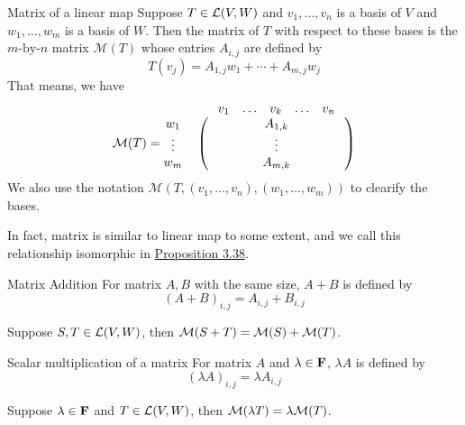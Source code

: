 \documentclass[12pt,a4paper]{article}
\begin{document}
    \begin{defi}{Matrix of a linear map}
        Suppose $T\in\mathcal{L}(V,W)$ and $v_1,\dots,v_n$ is a basis of $V$ and $w_1,\dots,w_m$ is a basis of $W$. Then the matrix of $T$ with respect to these bases is the $m\text{-by-}n$ matrix $\mathcal{M}(T)$ whose entries $A_{i,j}$ are defined by 
        $$T(v_j)=A_{1,j}w_1+\cdots+A_{m,j}w_j$$
        That means, we have
        \[\begin{tabular}{ccc}
                & $\begin{matrix}v_1&\dots&v_k&\dots&v_n\end{matrix}$\\
                $\mathcal{M}(T)=\begin{matrix}w_1\\\vdots\\w_m\end{matrix}$
                &$\begin{pmatrix}&\quad\quad\;&A_{1,k}&\quad\quad\;&
                \\&&\vdots&&\\&&A_{m,k}&&\end{pmatrix}$ \\
            \end{tabular}\]
        We also use the notation $\mathcal{M}(T,(v_1,\dots,v_n),(w_1,\dots,w_m))$ to clearify the bases.
    \end{defi}
    \begin{remark}
        In fact, matrix is similar to linear map to some extent, and we call this relationship isomorphic in \hyperref[3.38]{Proposition 3.38}. 
    \end{remark}
    \hfill

    \begin{defi}{Matrix Addition}
        For matrix $A,B$ with the same size, $A+B$ is defined by
        $$
        (A+B)_{i,j}=A_{i,j}+B_{i,j}
        $$
    \end{defi}
    \begin{prop}
        Suppose $S,T\in\mathcal{L}(V,W)$, then $\mathcal{M}(S+T)=\mathcal{M}(S)+\mathcal{M}(T)$.
    \end{prop}
    \hfill

    \begin{defi}{Scalar multiplication of a matrix}
        For matrix $A$ and $\lambda\in\mathbf{F}$, $\lambda A$ is defined by
        $$
        (\lambda A)_{i,j}=\lambda A_{i,j}
        $$
    \end{defi}
    \begin{prop}
        Suppose $\lambda\in\mathbf{F}$ and $T\in\mathcal{L}(V,W)$, then $\mathcal{M}(\lambda T)=\lambda\mathcal{M}(T)$.
    \end{prop}
    \hfill
\end{document}
